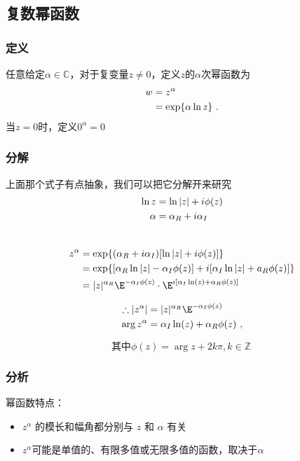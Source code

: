 
\begin{issues}
\issueDraft
\issueTODO
\end{issues}



\subsection{复数幂函数}

\subsubsection{定义}
任意给定$\alpha\in \mathbb{C}$，对于复变量$z\ne 0$，定义$z$的$\alpha$次幂函数为
\begin{align}
w&=z^\alpha\notag\\
&=\exp\{\alpha \ln z\}~.
\end{align}
当$z=0$时，定义$0^\alpha = 0$
\subsubsection{分解}
上面那个式子有点抽象，我们可以把它分解开来研究
\begin{align}
\ln z &= \ln |z|+i\phi(z)\notag\\
\alpha&=\alpha_R+i\alpha_I\notag\\~
\end{align}

\begin{align}
z^\alpha&=\exp\{(\alpha_R+i\alpha_I)[\ln |z|+i\phi(z)]\notag\}\\
&=\exp\{[\alpha_R \ln|z|-\alpha_I\phi (z)]+i[\alpha_I\ln|z|+a_R\phi(z)]\}\notag\\
&=|z|^{\alpha_R}\E^{-\alpha_I\phi(z)}\cdot \E^{i[\alpha_I\ln(z)+\alpha_R\phi(z)]}~
\end{align}

\begin{align}
\therefore |z^\alpha|&=|z|^{\alpha_R}\E^{-\alpha_I\phi(z)}\notag\\
\arg z^\alpha&=\alpha_I\ln(z)+\alpha_R\phi(z)\notag~,
\end{align}

\begin{equation}
\text{其中}\phi(z)=\arg z+2k\pi,k\in\mathbb Z~
\end{equation}



\subsubsection{分析}
幂函数特点：\\
\begin{itemize}
\item $z^\alpha$ 的模长和幅角都分别与 $z$ 和 $\alpha$ 有关\\
\item $z^\alpha$可能是单值的、有限多值或无限多值的函数，取决于$\alpha$
\end{itemize}

